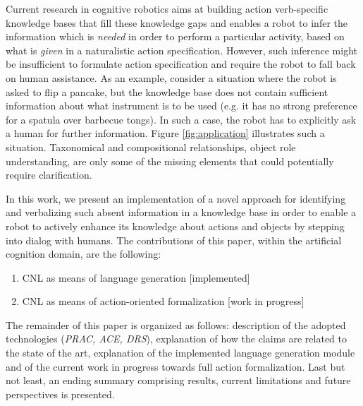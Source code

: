 \documentclass[oribibl]{llncs}
\begin{document}
Current research in cognitive robotics aims at building action 
verb-specific knowledge bases that fill these knowledge gaps and 
enables a robot to infer the information which is \textit{needed} in 
order to perform a particular activity, based on what is \textit 
{given} in a naturalistic action specification. However, such 
inference might be insufficient to formulate action specification and require 
the robot to fall back on human assistance. As an example, consider a situation where 
the robot is asked to flip a pancake, but the knowledge base does 
not contain sufficient information about what instrument is to be used 
(e.g. it has no strong preference for a spatula over barbecue 
tongs). In such a case, the robot has to explicitly ask a human for 
further information. Figure \ref{fig:application} illustrates such a 
situation. Taxonomical and compositional relationships, object role 
understanding, are only some of the missing elements that could 
potentially require clarification. 

In this work, we present an implementation of a novel approach for 
identifying and verbalizing such absent information in a knowledge
 base in order to enable a robot to actively enhance its knowledge
  about actions and objects by stepping into dialog with humans.
The contributions of this paper, within the artificial cognition domain,
 are the following:
\begin{enumerate}
    \item CNL as means of language generation \hfill [implemented]
    \item CNL as means of action-oriented formalization \hfill [work in progress]
\end{enumerate}
The remainder of this paper is organized as follows: 
description of the adopted technologies (\textit{PRAC, ACE, DRS}), 
explanation of how the claims are related to the state of the art, 
explanation of the implemented language generation module and of the current work
 in progress towards full action formalization. Last but not least, 
 an ending summary comprising results, current limitations and future perspectives is presented.
\end{document}
